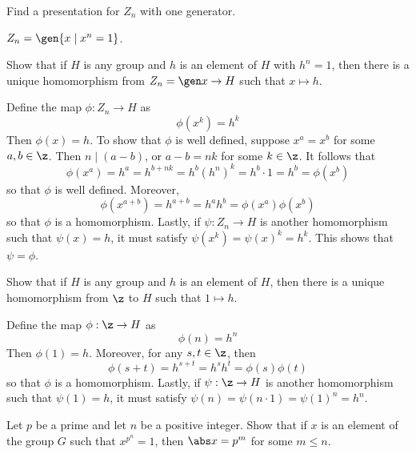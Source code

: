 \begin{exercise}\label{ex2.3.17}
    Find a presentation for $Z_n$ with one generator.
\end{exercise}

\begin{sol}
    $Z_n = \gen{x \mid x^n = 1}$.
\end{sol}

\begin{exercise}\label{ex2.3.18}
    Show that if $H$ is any group and $h$ is an element of $H$ with $h^n = 1$, then there is a unique homomorphism from $Z_n = \gen x \to H$ such that $x \mapsto h$.
\end{exercise}

\begin{sol}
    Define the map $\phi : Z_n \to H$ as
    \[\phi(x^k) = h^k\]
    Then $\phi(x) = h$. To show that $\phi$ is well defined, suppose $x^a = x^b$ for some $a, b \in \z$. Then $n \mid (a - b)$, or $a - b = nk$ for some $k \in \z$. It follows that
    \[\phi(x^a) = h^a = h^{b + nk} = h^b (h^n)^k = h^b \cdot 1 = h^b = \phi(x^b)\]
    so that $\phi$ is well defined. Moreover,
    \[\phi(x^{a + b}) = h^{a + b} = h^a h^b = \phi(x^a) \phi(x^b)\]
    so that $\phi$ is a homomorphism. Lastly, if $\psi : Z_n \to H$ is another homomorphism such that $\psi(x) = h$, it must satisfy $\psi(x^k) = \psi(x)^k = h^k$. This shows that $\psi = \phi$.
\end{sol}

\begin{exercise}\label{ex2.3.19}
    Show that if $H$ is any group and $h$ is an element of $H$, then there is a unique homomorphism from $\z$ to $H$ such that $1 \mapsto h$.
\end{exercise}

\begin{sol}
    Define the map $\phi : \z \to H$ as
    \[\phi(n) = h^n\]
    Then $\phi(1) = h$. Moreover, for any $s, t \in \z$, then
    \[\phi(s + t) = h^{s + t} = h^sh^t = \phi(s)\phi(t)\]
    so that $\phi$ is a homomorphism. Lastly, if $\psi : \z \to H$ is another homomorphism such that $\psi(1) = h$, it must satisfy $\psi(n) = \psi(n \cdot 1) = \psi(1)^n = h^n$.
\end{sol}

\begin{exercise}\label{ex2.3.20}
    Let $p$ be a prime and let $n$ be a positive integer. Show that if $x$ is an element of the group $G$ such that $x^{p^n} = 1$, then $\abs x = p^m$ for some $m \leq n$.
\end{exercise}

